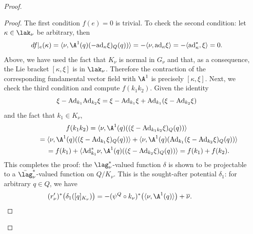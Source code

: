 \begin{proof}
\begin{proof}
The f\/irst condition $f(e)=0$ is trivial. To check the second condition: let $\kappa \in \lak_\nu$ be arbitrary, then
  \[
  df|_e(\kappa) = \langle \nu, \A^{1}(q)(-{\rm ad}_{\kappa}\xi)_Q(q))\rangle = -\langle \nu, {\rm ad}_\kappa\xi\rangle  = -\langle {\rm ad}^*_\kappa,\xi\rangle=0.
  \]
Above, we have used the fact that $K_\nu$ is normal in $G_\nu$ and that, as a consequence, the Lie bracket $[\kappa,\xi]$ is in $\lak_\nu$. Therefore the contraction of the corresponding fundamental vector f\/ield with $\A^{1}$ is precisely $[\kappa,\xi]$. Next, we check the third condition and compute $f(k_1k_2)$. Given the identity
  \[
  \xi-{\rm Ad}_{k_1}{\rm Ad}_{k_2} \xi =\xi -{\rm Ad}_{k_1}\xi+{\rm Ad}_{k_1}(\xi-{\rm Ad}_{k_2}\xi)
  \]
  and the fact that $k_1\in K_\nu$,
  \begin{gather*}
    f(k_1k_2) = \langle \nu, \A^{1}(q)((\xi-{\rm Ad}_{k_1k_2}\xi)_Q(q))\rangle\\
    \phantom{f(k_1k_2)}{} = \langle \nu, \A^{1}(q)((\xi-{\rm Ad}_{k_1}\xi)_Q(q)) \rangle + \langle \nu, \A^{1}(q)({\rm Ad}_{k_1}(\xi-{\rm Ad}_{k_2}\xi)_Q(q))\rangle\\
    \phantom{f(k_1k_2)}{} = f(k_1) +  \langle {\rm Ad}_{k_1}^*\nu, \A^{1}(q)((\xi-{\rm Ad}_{k_2}\xi)_Q(q))\rangle = f(k_1)+f(k_2).
  \end{gather*}
This completes the proof: the $\lag_\nu^*$-valued function $\delta$ is shown to be projectable to a $\bar\lag_\nu^*$-valued function on $Q/K_\nu$.  This is the sought-after potential $\delta_1$: for arbitrary $q\in Q$, we have \[
(r'_\nu)^*\big(\delta_1([q]_{K_\nu})\big)=  -(\psi^Q\circ k_\nu)^*\big(%
\langle \nu , \A^{1}(q)\rangle\big) + \overline\nu . \tag*{\qed}
\]\renewcommand{\qed}{}
\end{proof}


\end{proof}
